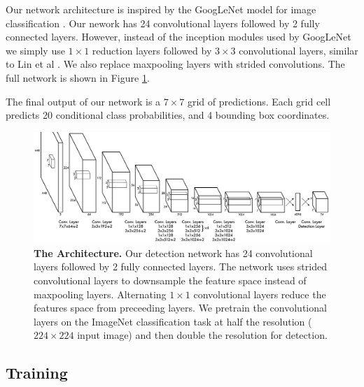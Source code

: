 \documentclass{article} %
\begin{document}
Our network architecture is inspired by the GoogLeNet model for image classification \cite{DBLP:journals/corr/SzegedyLJSRAEVR14}. Our nework has 24 convolutional layers followed by 2 fully connected layers. However, instead of the inception modules used by GoogLeNet we simply use $1 \times 1$ reduction layers followed by $3 \times 3$ convolutional layers, similar to Lin et al \cite{DBLP:journals/corr/LinCY13}. We also replace maxpooling layers with strided convolutions. The full network is shown in Figure \ref{net}.

The final output of our network is a $7 \times 7$ grid of predictions. Each grid cell predicts 20 conditional class probabilities, and 4 bounding box coordinates.

   \begin{figure}[t]
      \centering
        \includegraphics[width=\linewidth]{detectnet2}
      \caption{\small \textbf{The Architecture.} Our detection network has 24 convolutional layers followed by 2 fully connected layers. The network uses strided convolutional layers to downsample the feature space instead of maxpooling layers. Alternating $1 \times 1$ convolutional layers reduce the features space from preceeding layers. We pretrain the convolutional layers on the ImageNet classification task at half the resolution ($224 \times 224$ input image) and then double the resolution for detection.}\vspace{-.3cm}
      \label{net}
   \end{figure}

\subsection{Training}
%
\end{document}
